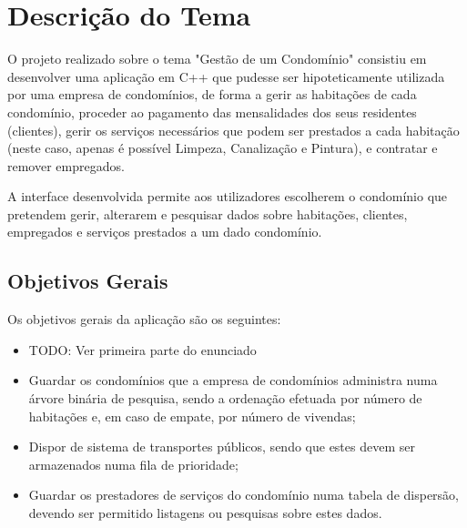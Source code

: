 \documentclass[a4paper]{article}
\begin{document}

\newpage

\tableofcontents

\newpage

\section{Descrição do Tema}

O projeto realizado sobre o tema "Gestão de um Condomínio" consistiu em desenvolver uma aplicação em C++ que pudesse ser hipoteticamente utilizada por uma empresa de condomínios, de forma a gerir as habitações de cada condomínio, proceder ao pagamento das mensalidades dos seus residentes (clientes), gerir os serviços necessários que podem ser prestados a cada habitação (neste caso, apenas é possível Limpeza, Canalização e Pintura), e contratar e remover empregados.

A interface desenvolvida permite aos utilizadores escolherem o condomínio que pretendem gerir, alterarem e pesquisar dados sobre habitações, clientes, empregados e serviços prestados a um dado condomínio.

\subsection{Objetivos Gerais}

Os objetivos gerais da aplicação são os seguintes:

\begin{itemize}

	\item TODO: Ver primeira parte do enunciado
	\item Guardar os condomínios que a empresa de condomínios administra numa árvore binária de pesquisa, sendo a ordenação efetuada por número de habitações e, em caso de empate, por número de vivendas;
	\item Dispor de sistema de transportes públicos, sendo que estes devem ser armazenados numa fila de prioridade;
	\item Guardar os prestadores de serviços do condomínio numa tabela de dispersão, devendo ser permitido listagens ou pesquisas sobre estes dados.

\end{itemize}
\end{document}
